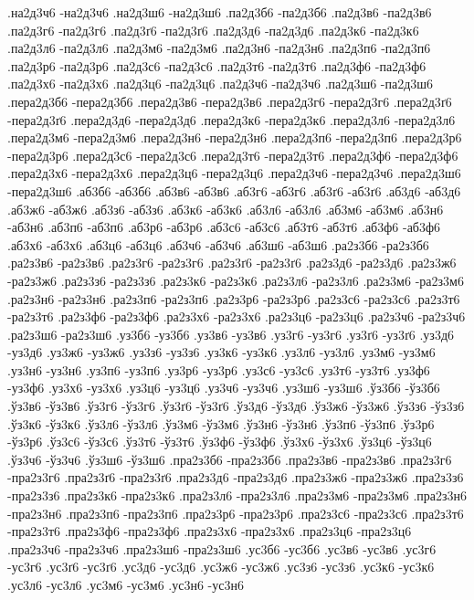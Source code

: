 {.на2д3ч6 -на2д3ч6
.на2д3ш6 -на2д3ш6
.па2д3б6 -па2д3б6
.па2д3в6 -па2д3в6
.па2д3г6 -па2д3г6
.па2д3ґ6 -па2д3ґ6
.па2д3д6 -па2д3д6
.па2д3к6 -па2д3к6
.па2д3л6 -па2д3л6
.па2д3м6 -па2д3м6
.па2д3н6 -па2д3н6
.па2д3п6 -па2д3п6
.па2д3р6 -па2д3р6
.па2д3с6 -па2д3с6
.па2д3т6 -па2д3т6
.па2д3ф6 -па2д3ф6
.па2д3х6 -па2д3х6
.па2д3ц6 -па2д3ц6
.па2д3ч6 -па2д3ч6
.па2д3ш6 -па2д3ш6
.пера2д3б6 -пера2д3б6
.пера2д3в6 -пера2д3в6
.пера2д3г6 -пера2д3г6
.пера2д3ґ6 -пера2д3ґ6
.пера2д3д6 -пера2д3д6
.пера2д3к6 -пера2д3к6
.пера2д3л6 -пера2д3л6
.пера2д3м6 -пера2д3м6
.пера2д3н6 -пера2д3н6
.пера2д3п6 -пера2д3п6
.пера2д3р6 -пера2д3р6
.пера2д3с6 -пера2д3с6
.пера2д3т6 -пера2д3т6
.пера2д3ф6 -пера2д3ф6
.пера2д3х6 -пера2д3х6
.пера2д3ц6 -пера2д3ц6
.пера2д3ч6 -пера2д3ч6
.пера2д3ш6 -пера2д3ш6
.аб3б6 -аб3б6
.аб3в6 -аб3в6
.аб3г6 -аб3г6
.аб3ґ6 -аб3ґ6
.аб3д6 -аб3д6
.аб3ж6 -аб3ж6
.аб3з6 -аб3з6
.аб3к6 -аб3к6
.аб3л6 -аб3л6
.аб3м6 -аб3м6
.аб3н6 -аб3н6
.аб3п6 -аб3п6
.аб3р6 -аб3р6
.аб3с6 -аб3с6
.аб3т6 -аб3т6
.аб3ф6 -аб3ф6
.аб3х6 -аб3х6
.аб3ц6 -аб3ц6
.аб3ч6 -аб3ч6
.аб3ш6 -аб3ш6
.ра2з3б6 -ра2з3б6
.ра2з3в6 -ра2з3в6
.ра2з3г6 -ра2з3г6
.ра2з3ґ6 -ра2з3ґ6
.ра2з3д6 -ра2з3д6
.ра2з3ж6 -ра2з3ж6
.ра2з3з6 -ра2з3з6
.ра2з3к6 -ра2з3к6
.ра2з3л6 -ра2з3л6
.ра2з3м6 -ра2з3м6
.ра2з3н6 -ра2з3н6
.ра2з3п6 -ра2з3п6
.ра2з3р6 -ра2з3р6
.ра2з3с6 -ра2з3с6
.ра2з3т6 -ра2з3т6
.ра2з3ф6 -ра2з3ф6
.ра2з3х6 -ра2з3х6
.ра2з3ц6 -ра2з3ц6
.ра2з3ч6 -ра2з3ч6
.ра2з3ш6 -ра2з3ш6
.уз3б6 -уз3б6
.уз3в6 -уз3в6
.уз3г6 -уз3г6
.уз3ґ6 -уз3ґ6
.уз3д6 -уз3д6
.уз3ж6 -уз3ж6
.уз3з6 -уз3з6
.уз3к6 -уз3к6
.уз3л6 -уз3л6
.уз3м6 -уз3м6
.уз3н6 -уз3н6
.уз3п6 -уз3п6
.уз3р6 -уз3р6
.уз3с6 -уз3с6
.уз3т6 -уз3т6
.уз3ф6 -уз3ф6
.уз3х6 -уз3х6
.уз3ц6 -уз3ц6
.уз3ч6 -уз3ч6
.уз3ш6 -уз3ш6
.ўз3б6 -ўз3б6
.ўз3в6 -ўз3в6
.ўз3г6 -ўз3г6
.ўз3ґ6 -ўз3ґ6
.ўз3д6 -ўз3д6
.ўз3ж6 -ўз3ж6
.ўз3з6 -ўз3з6
.ўз3к6 -ўз3к6
.ўз3л6 -ўз3л6
.ўз3м6 -ўз3м6
.ўз3н6 -ўз3н6
.ўз3п6 -ўз3п6
.ўз3р6 -ўз3р6
.ўз3с6 -ўз3с6
.ўз3т6 -ўз3т6
.ўз3ф6 -ўз3ф6
.ўз3х6 -ўз3х6
.ўз3ц6 -ўз3ц6
.ўз3ч6 -ўз3ч6
.ўз3ш6 -ўз3ш6
.пра2з3б6 -пра2з3б6
.пра2з3в6 -пра2з3в6
.пра2з3г6 -пра2з3г6
.пра2з3ґ6 -пра2з3ґ6
.пра2з3д6 -пра2з3д6
.пра2з3ж6 -пра2з3ж6
.пра2з3з6 -пра2з3з6
.пра2з3к6 -пра2з3к6
.пра2з3л6 -пра2з3л6
.пра2з3м6 -пра2з3м6
.пра2з3н6 -пра2з3н6
.пра2з3п6 -пра2з3п6
.пра2з3р6 -пра2з3р6
.пра2з3с6 -пра2з3с6
.пра2з3т6 -пра2з3т6
.пра2з3ф6 -пра2з3ф6
.пра2з3х6 -пра2з3х6
.пра2з3ц6 -пра2з3ц6
.пра2з3ч6 -пра2з3ч6
.пра2з3ш6 -пра2з3ш6
.ус3б6 -ус3б6
.ус3в6 -ус3в6
.ус3г6 -ус3г6
.ус3ґ6 -ус3ґ6
.ус3д6 -ус3д6
.ус3ж6 -ус3ж6
.ус3з6 -ус3з6
.ус3к6 -ус3к6
.ус3л6 -ус3л6
.ус3м6 -ус3м6
.ус3н6 -ус3н6
}
